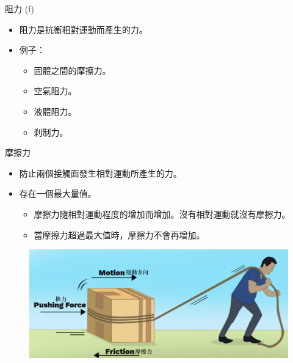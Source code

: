 \documentclass[beamer=true]{standalone}
\begin{document}
\begin{frame}{阻力 (f) }
    \begin{itemize}
        \item 阻力是抗衡相對運動而產生的力。
        \item 例子：
              \begin{itemize}
                  \item 固體之間的摩擦力。
                  \item 空氣阻力。
                  \item 液體阻力。
                  \item 刹制力。
              \end{itemize}
    \end{itemize}

\end{frame}
\begin{frame}{摩擦力}

    \begin{itemize}
        \item 防止兩個接觸面發生相對運動所產生的力。
        \item 存在一個最大量值。
              \begin{itemize}
                  \item 摩擦力隨相對運動程度的增加而增加。沒有相對運動就沒有摩擦力。
                  \item 當摩擦力超過最大值時，摩擦力不會再增加。
              \end{itemize}
    \end{itemize}
    \begin{figure}[h!]
        \centering
        \includegraphics[width=.5\textwidth]{assets/48a9a34c.png}
    \end{figure}
\end{frame}

\end{document}
